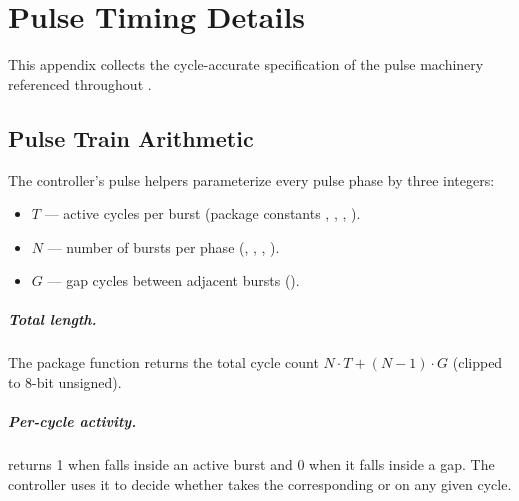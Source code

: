 
\chapter{Pulse Timing Details}
\label{app:pulse-timing}

This appendix collects the cycle-accurate specification of the pulse
machinery referenced throughout .

\section{Pulse Train Arithmetic}
\label{app:pulse-math}

The controller's pulse helpers parameterize every pulse phase by three
integers:

\begin{itemize}
    \item \(T\) --- active cycles per burst (package constants
          , , , ).
    \item \(N\) --- number of bursts per phase
          (, ,
          , ).
    \item \(G\) ---  gap cycles between adjacent bursts
          ().
\end{itemize}

\paragraph{Total length.} The package function
 returns the total cycle count
\(N \cdot T + (N-1) \cdot G\) (clipped to 8-bit unsigned).

\paragraph{Per-cycle activity.} 
returns 1 when  falls inside an active burst and 0
when it falls inside a gap. The controller uses it to decide whether
 takes the corresponding  or
 on any given cycle.

